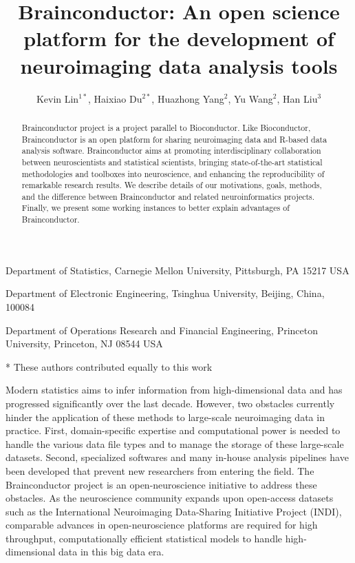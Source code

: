 \documentclass{nature}
\title{Brainconductor: An open science platform for the development of
neuroimaging
data analysis tools}
\author{Kevin Lin$^{1*}$, Haixiao Du$^{2*}$, Huazhong
Yang$^2$, Yu Wang$^2$, Han Liu$^3${\color{red}}}
\begin{document}
\maketitle



\begin{affiliations}
\item Department of Statistics, Carnegie Mellon University,
Pittsburgh, PA 15217 USA
\item Department of Electronic Engineering, Tsinghua University, Beijing, China,
100084
\item Department of Operations Research and Financial Engineering, Princeton
University, Princeton, NJ 08544 USA
\item[*] These authors contributed equally to this work
\end{affiliations}

\begin{abstract}
    Brainconductor project is a project parallel to Bioconductor. Like
Bioconductor, Brainconductor is an open platform for sharing neuroimaging data
and R-based data analysis software. Brainconductor aims at promoting
interdisciplinary collaboration between neuroscientists and
statistical scientists, bringing state-of-the-art statistical methodologies and
toolboxes into neuroscience, and enhancing the reproducibility of remarkable
research results. We describe details of our motivations, goals, methods, and
the difference between Brainconductor and related neuroinformatics projects.
Finally, we present some working instances to better explain advantages of
Brainconductor.
\end{abstract}


Modern statistics aims to infer information from high-dimensional data
and has progressed significantly over the last decade.
However, two obstacles currently hinder the
application of these methods to large-scale neuroimaging data
in practice.
First, domain-specific expertise and computational power is needed to handle
the various data file types and to manage the storage
of these large-scale datasets. Second, specialized softwares and
many in-house analysis pipelines have been developed that
prevent new researchers from entering the field.
The Brainconductor project is an open-neuroscience
initiative to address
these obstacles.
As the neuroscience community expands upon open-access
datasets such as the  International Neuroimaging Data-Sharing
Initiative Project (INDI), comparable advances in
open-neuroscience platforms are required
for high
throughput, computationally efficient statistical models
to handle high-dimensional data in this big data era.
\end{document}
